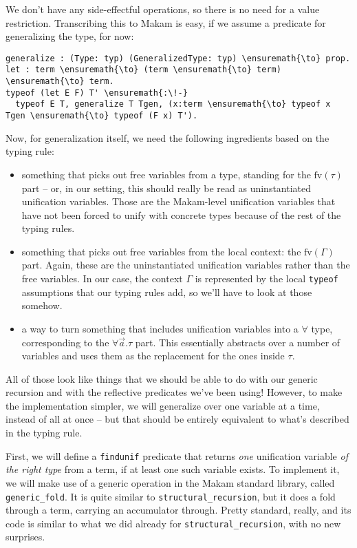 We don't have any side-effectful operations, so there is no need for a
value restriction. Transcribing this to Makam is easy, if we assume a
predicate for generalizing the type, for now:

\begin{verbatim}
generalize : (Type: typ) (GeneralizedType: typ) \ensuremath{\to} prop.
let : term \ensuremath{\to} (term \ensuremath{\to} term) \ensuremath{\to} term.
typeof (let E F) T' \ensuremath{:\!-}
  typeof E T, generalize T Tgen, (x:term \ensuremath{\to} typeof x Tgen \ensuremath{\to} typeof (F x) T').
\end{verbatim}

Now, for generalization itself, we need the following ingredients based
on the typing rule:

\begin{itemize}
\tightlist
\item
  something that picks out free variables from a type, standing for the
  \(\text{fv}(\tau)\) part -- or, in our setting, this should really be
  read as uninstantiated unification variables. Those are the
  Makam-level unification variables that have not been forced to unify
  with concrete types because of the rest of the typing rules.
\item
  something that picks out free variables from the local context: the
  \(\text{fv}(\Gamma)\) part. Again, these are the uninstantiated
  unification variables rather than the free variables. In our case, the
  context \(\Gamma\) is represented by the local \texttt{typeof}
  assumptions that our typing rules add, so we'll have to look at those
  somehow.
\item
  a way to turn something that includes unification variables into a
  \(\forall\) type, corresponding to the \(\forall \vec{a}.\tau\) part.
  This essentially abstracts over a number of variables and uses them as
  the replacement for the ones inside \(\tau\).
\end{itemize}

All of those look like things that we should be able to do with our
generic recursion and with the reflective predicates we've been using!
However, to make the implementation simpler, we will generalize over one
variable at a time, instead of all at once -- but that should be
entirely equivalent to what's described in the typing rule.

First, we will define a \texttt{findunif} predicate that returns
\emph{one} unification variable \emph{of the right type} from a term, if
at least one such variable exists. To implement it, we will make use of
a generic operation in the Makam standard library, called
\texttt{generic\_fold}. It is quite similar to
\texttt{structural\_recursion}, but it does a fold through a term,
carrying an accumulator through. Pretty standard, really, and its code
is similar to what we did already for \texttt{structural\_recursion},
with no new surprises.

